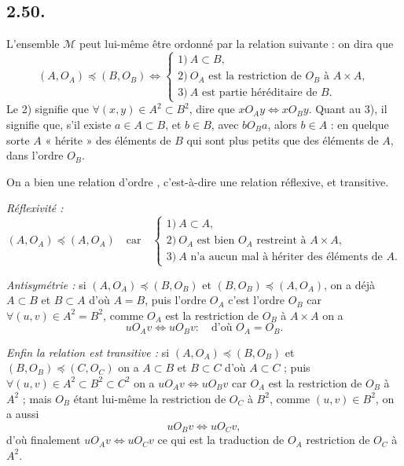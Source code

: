 \subsection*{2.50.}
L'ensemble $\mathcal M$ peut lui-même être ordonné par la relation suivante : on dira que
\[
(A,O_A)\preccurlyeq(B,O_B)
\Leftrightarrow
\begin{cases}
1)\ A\subset B,\\
2)\ O_A\text{ est la restriction de }O_B\text{ à }A\times A,\\
3)\ A\text{ est partie héréditaire de }B.
\end{cases}
\]
Le 2) signifie que $\forall(x,y)\in A^2\subset B^2$, dire que $xO_Ay\Leftrightarrow xO_By$. Quant au 3), il signifie que, s'il existe $a\in A\subset B$, et $b\in B$, avec $bO_Ba$, alors $b\in A$ : en quelque sorte $A$ « hérite » des éléments de $B$ qui sont plus petits que des éléments de $A$, dans l'ordre $O_B$.

On a bien une relation d'ordre , c'est-à-dire une relation réflexive,  et transitive.

\emph{Réflexivité :}
\[
(A,O_A)\preccurlyeq(A,O_A)\quad\text{car}\quad
\begin{cases}
1)\ A\subset A,\\
2)\ O_A\text{ est bien }O_A\text{ restreint à }A\times A,\\
3)\ A\text{ n'a aucun mal à hériter des éléments de }A.
\end{cases}
\]

\emph{Antisymétrie :} si $(A,O_A)\preccurlyeq(B,O_B)$ et $(B,O_B)\preccurlyeq(A,O_A)$, on a déjà $A\subset B$ et $B\subset A$ d'où $A=B$, puis l'ordre $O_A$ c'est l'ordre $O_B$ car $\forall(u,v)\in A^2=B^2$, comme $O_A$ est la restriction de $O_B$ à $A\times A$ on a
\[
uO_Av\Leftrightarrow uO_Bv :\quad\text{d'où }O_A=O_B.
\]

\emph{Enfin la relation est transitive :} si $(A,O_A)\preccurlyeq(B,O_B)$ et $(B,O_B)\preccurlyeq(C,O_C)$ on a $A\subset B$ et $B\subset C$ d'où $A\subset C$ ; puis $\forall(u,v)\in A^2\subset B^2\subset C^2$ on a $uO_Av\Leftrightarrow uO_Bv$ car $O_A$ est la restriction de $O_B$ à $A^2$ ; mais $O_B$ étant lui-même la restriction de $O_C$ à $B^2$, comme $(u,v)\in B^2$, on a aussi
\[
uO_Bv\Leftrightarrow uO_Cv,
\]
d'où finalement $uO_Av\Leftrightarrow uO_Cv$ ce qui est la traduction de $O_A$ restriction de $O_C$ à $A^2$.

